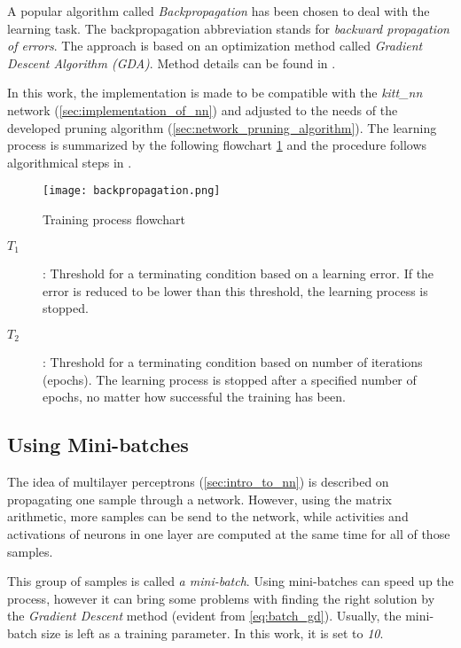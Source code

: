 A popular algorithm called \textit{Backpropagation} has been chosen to deal with the learning task. The backpropagation abbreviation stands for \textit{backward propagation of errors}. The approach is based on an optimization method called \textit{Gradient Descent Algorithm (GDA)}. Method details can be found in \citep{online:nn_demystified}.

In this work, the implementation is made to be compatible with the \textit{kitt\_nn} network (\cref{sec:implementation_of_nn}) and adjusted to the needs of the developed pruning algorithm (\cref{sec:network_pruning_algorithm}). The learning process is summarized by the following flowchart \ref{img:backpropagation} and the procedure follows algorithmical steps in \citep{online:nn_demystified}.

\begin{figure}[H]
  \centering
  \texttt{[image: backpropagation.png]}
  \caption{Training process flowchart}
  \label{img:backpropagation}
\end{figure}

\begin{description}
\item[$ T_1 $] : Threshold for a terminating condition based on a learning error. If the error is reduced to be lower than this threshold, the learning process is stopped.
\item[$ T_2 $] : Threshold for a terminating condition based on number of iterations (epochs). The learning process is stopped after a specified number of epochs, no matter how successful the training has been.
\end{description}

\subsection{Using Mini-batches} \label{ssec:minibatches}
The idea of multilayer perceptrons (\cref{sec:intro_to_nn}) is described on propagating one sample through a network. However, using the matrix arithmetic, more samples can be send to the network, while activities and activations of neurons in one layer are computed at the same time for all of those samples.

This group of samples is called \textit{a mini-batch}. Using mini-batches can speed up the process, however it can bring some problems with finding the right solution by the \textit{Gradient Descent} method (evident from \cref{eq:batch_gd}). Usually, the mini-batch size is left as a training parameter. In this work, it is set to \textit{10}.

